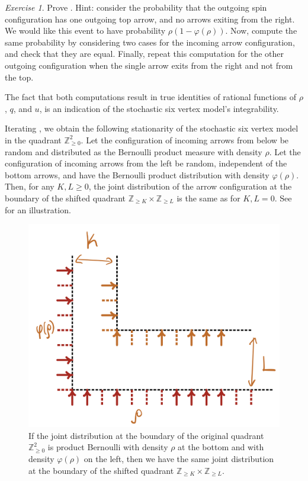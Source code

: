 \documentclass[letterpaper,11pt,oneside,reqno]{article}
\numberwithin{equation}{section}
\theoremstyle{definition}
\theoremstyle{remark}
\newtheorem{exercise}{Exercise}[section]
\begin{document}
\begin{exercise}\label{exercise:6v_stat}
	Prove .
	Hint: consider the probability that the outgoing spin configuration 
	has one outgoing top arrow, and no arrows exiting from the right. 
	We would like this event to have probability
	$\rho\left( 1-\varphi(\rho) \right)$.
	Now, compute the same probability 
	by considering two cases for the incoming arrow configuration, and check that they are equal.
	Finally, repeat this computation for the other outgoing configuration when the single arrow exits from the right and not from the top.

	The fact that both computations result in true identities of rational functions of $\rho$, $q$, and $u$, is an indication of the stochastic six vertex model's integrability.
\end{exercise}

Iterating ,
we obtain the following stationarity of the stochastic six vertex model
in the quadrant $\mathbb{Z}^{2}_{\ge0}$.
Let the configuration of incoming arrows from below be 
random and distributed as the Bernoulli product measure with density $\rho$.
Let the configuration of incoming arrows from the left 
be random, independent of the bottom arrows, and have
the Bernoulli product distribution with density $\varphi(\rho)$.
Then, for any $K,L\ge0$, 
the joint distribution of the arrow configuration
at the boundary of the shifted quadrant $\mathbb{Z}_{\ge K}\times \mathbb{Z}_{\ge L}$
is the same as for $K,L=0$. See  for an illustration.
\begin{figure}[htpb]
	\centering
	\includegraphics[width=.5\textwidth]{./images/shift_stationarity.png}
	\caption{If the joint distribution at the 
	boundary of the original quadrant $\mathbb{Z}_{\ge0}^2$
	is product Bernoulli with density $\rho$ at the bottom and with density
	$\varphi(\rho)$ on the left, then we have the same joint distribution
	at the boundary of the shifted quadrant $\mathbb{Z}_{\ge K}\times \mathbb{Z}_{\ge L}$.}
	\label{fig:shift_stationarity}
\end{figure}
\end{document}
